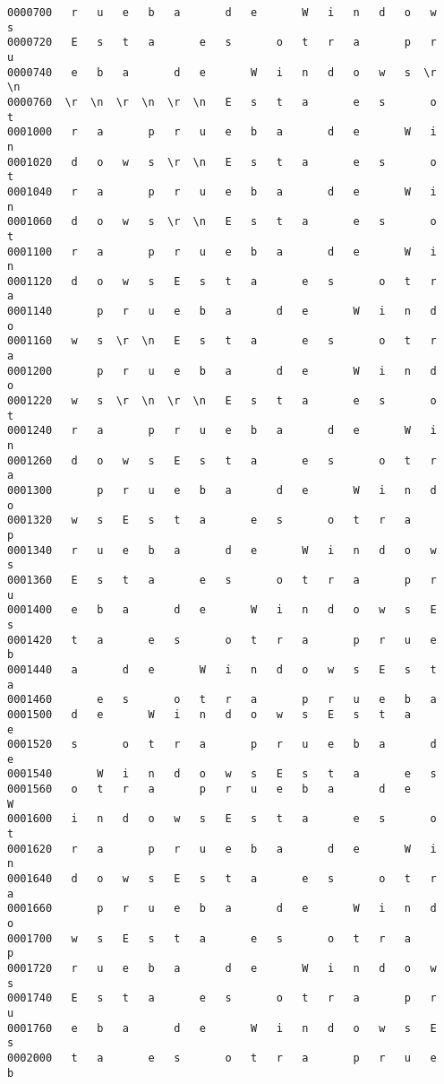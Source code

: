 \documentclass[a4paper,11pt]{article}
\begin{document}
\begin{itemize}
\begin{verbatim}
0000700   r   u   e   b   a       d   e       W   i   n   d   o   w   s
0000720   E   s   t   a       e   s       o   t   r   a       p   r   u
0000740   e   b   a       d   e       W   i   n   d   o   w   s  \r  \n
0000760  \r  \n  \r  \n  \r  \n   E   s   t   a       e   s       o   t
0001000   r   a       p   r   u   e   b   a       d   e       W   i   n
0001020   d   o   w   s  \r  \n   E   s   t   a       e   s       o   t
0001040   r   a       p   r   u   e   b   a       d   e       W   i   n
0001060   d   o   w   s  \r  \n   E   s   t   a       e   s       o   t
0001100   r   a       p   r   u   e   b   a       d   e       W   i   n
0001120   d   o   w   s   E   s   t   a       e   s       o   t   r   a
0001140       p   r   u   e   b   a       d   e       W   i   n   d   o
0001160   w   s  \r  \n   E   s   t   a       e   s       o   t   r   a
0001200       p   r   u   e   b   a       d   e       W   i   n   d   o
0001220   w   s  \r  \n  \r  \n   E   s   t   a       e   s       o   t
0001240   r   a       p   r   u   e   b   a       d   e       W   i   n
0001260   d   o   w   s   E   s   t   a       e   s       o   t   r   a
0001300       p   r   u   e   b   a       d   e       W   i   n   d   o
0001320   w   s   E   s   t   a       e   s       o   t   r   a       p
0001340   r   u   e   b   a       d   e       W   i   n   d   o   w   s
0001360   E   s   t   a       e   s       o   t   r   a       p   r   u
0001400   e   b   a       d   e       W   i   n   d   o   w   s   E   s
0001420   t   a       e   s       o   t   r   a       p   r   u   e   b
0001440   a       d   e       W   i   n   d   o   w   s   E   s   t   a
0001460       e   s       o   t   r   a       p   r   u   e   b   a    
0001500   d   e       W   i   n   d   o   w   s   E   s   t   a       e
0001520   s       o   t   r   a       p   r   u   e   b   a       d   e
0001540       W   i   n   d   o   w   s   E   s   t   a       e   s    
0001560   o   t   r   a       p   r   u   e   b   a       d   e       W
0001600   i   n   d   o   w   s   E   s   t   a       e   s       o   t
0001620   r   a       p   r   u   e   b   a       d   e       W   i   n
0001640   d   o   w   s   E   s   t   a       e   s       o   t   r   a
0001660       p   r   u   e   b   a       d   e       W   i   n   d   o
0001700   w   s   E   s   t   a       e   s       o   t   r   a       p
0001720   r   u   e   b   a       d   e       W   i   n   d   o   w   s
0001740   E   s   t   a       e   s       o   t   r   a       p   r   u
0001760   e   b   a       d   e       W   i   n   d   o   w   s   E   s
0002000   t   a       e   s       o   t   r   a       p   r   u   e   b

\end{verbatim}
\end{itemize}
\end{document}

